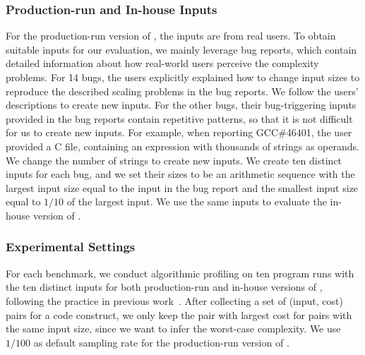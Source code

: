 \subsubsection{Production-run and In-house Inputs}






For the production-run version of \Tool, the inputs
are from real users. 
To obtain suitable inputs for our evaluation, 
we mainly leverage bug reports, 
which contain detailed information about how real-world 
users perceive the complexity problems. 
For 14 bugs, 
the users explicitly explained how to change input sizes 
to reproduce the described scaling problems in the bug reports. 
We follow the users' descriptions to create new inputs. 
For the other bugs, their bug-triggering inputs provided 
in the bug reports contain repetitive patterns, 
so that it is not difficult for us to create new inputs.
For example, when reporting GCC\#46401,
the user provided a C file, 
containing an expression with thousands of strings as operands. 
We change the number of strings to create new inputs. 
We create ten distinct inputs for each bug, 
and we set their sizes 
to be an arithmetic sequence with the largest input size
equal to the input in the bug report and the 
smallest input size equal to $1/10$ 
of the largest input.
We use the same inputs to evaluate the in-house version of \Tool. 






\subsubsection{Experimental Settings}

For each benchmark, we conduct algorithmic profiling on ten 
program runs with the ten distinct inputs for both production-run 
and in-house versions of \Tool, following the practice in 
previous work~\cite{joy.asplos13,SongOOPSLA2014}.
After collecting a set of (input, cost) pairs for a code construct,
we only keep the pair with largest cost for pairs with the same input size,
since we want to infer the worst-case complexity.
We use $1/100$ as default sampling rate for the production-run version of \Tool.


